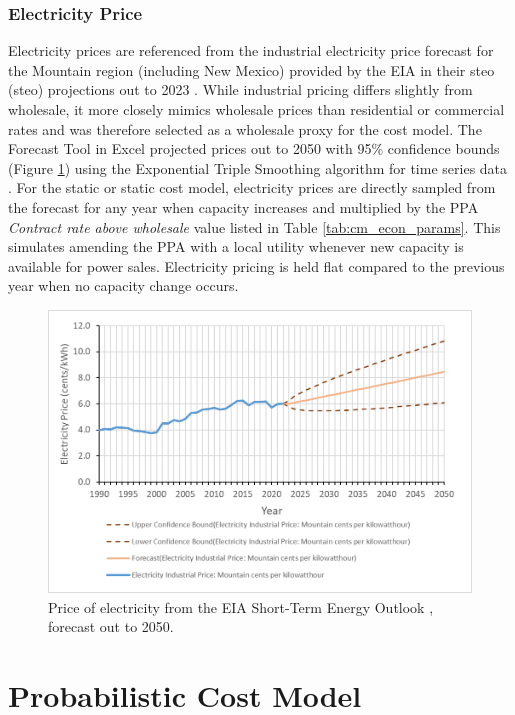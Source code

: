 \subsubsection{Electricity Price}

Electricity prices are referenced from the industrial electricity price forecast for the Mountain region (including New Mexico) provided by the EIA in their \acrlong{steo} (\acrshort{steo}) projections out to 2023 \citep{eia_short-term_2021}. While industrial pricing differs slightly from wholesale, it more closely mimics wholesale prices than residential or commercial rates and was therefore selected as a wholesale proxy for the cost model. The Forecast Tool in Excel projected prices out to 2050 with 95\% confidence bounds (Figure \ref{fig:electricity_pricing}) using the Exponential Triple Smoothing algorithm for time series data \citep{microsoft_forecastets_2021}. For the static or static cost model, electricity prices are directly sampled from the forecast for any year when capacity increases and multiplied by the PPA \textit{Contract rate above wholesale} value listed in Table \ref{tab:cm_econ_params}. This simulates amending the PPA with a local utility whenever new capacity is available for power sales. Electricity pricing is held flat compared to the previous year when no capacity change occurs.

\begin{figure}[!htp]
\centering
\includegraphics[width=.8\textwidth]{templates/images/Figure-EIA_Electricity_Forecast.png}
\caption[Electricity price forecast]{Price of electricity from the EIA Short-Term Energy Outlook \protect\citep{eia_short-term_2021}, forecast out to 2050.}
\label{fig:electricity_pricing}
\end{figure}

\section{Probabilistic Cost Model}
\label{ch4:cm_uncertainties}

